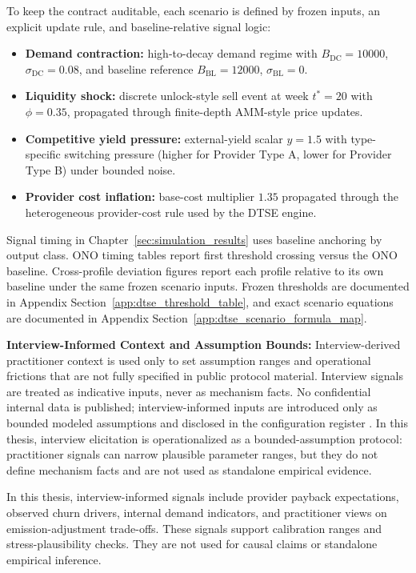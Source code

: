 To keep the contract auditable, each scenario is defined by frozen inputs, an explicit update rule, and baseline-relative signal logic:
\begin{itemize}
    \item \textbf{Demand contraction:} high-to-decay demand regime with \(B_{\mathrm{DC}}=10000\), \(\sigma_{\mathrm{DC}}=0.08\), and baseline reference \(B_{\mathrm{BL}}=12000\), \(\sigma_{\mathrm{BL}}=0\).
    \item \textbf{Liquidity shock:} discrete unlock-style sell event at week \(t^*=20\) with \(\phi=0.35\), propagated through finite-depth AMM-style price updates.
    \item \textbf{Competitive yield pressure:} external-yield scalar \(y=1.5\) with type-specific switching pressure (higher for Provider Type A, lower for Provider Type B) under bounded noise.
    \item \textbf{Provider cost inflation:} base-cost multiplier \(1.35\) propagated through the heterogeneous provider-cost rule used by the DTSE engine.
\end{itemize}

Signal timing in Chapter~\ref{sec:simulation_results} uses baseline anchoring by output class. ONO timing tables report first threshold crossing versus the ONO baseline. Cross-profile deviation figures report each profile relative to its own baseline under the same frozen scenario inputs. Frozen thresholds are documented in Appendix Section~\ref{app:dtse_threshold_table}, and exact scenario equations are documented in Appendix Section~\ref{app:dtse_scenario_formula_map}.

\noindent\textbf{Interview-Informed Context and Assumption Bounds:}
Interview-derived practitioner context is used only to set assumption ranges and operational frictions that are not fully specified in public protocol material. Interview signals are treated as indicative inputs, never as mechanism facts. No confidential internal data is published; interview-informed inputs are introduced only as bounded modeled assumptions and disclosed in the configuration register \cite{Morris2019, Braakman2022}.
In this thesis, interview elicitation is operationalized as a bounded-assumption protocol: practitioner signals can narrow plausible parameter ranges, but they do not define mechanism facts and are not used as standalone empirical evidence.

In this thesis, interview-informed signals include provider payback expectations, observed churn drivers, internal demand indicators, and practitioner views on emission-adjustment trade-offs. These signals support calibration ranges and stress-plausibility checks. They are not used for causal claims or standalone empirical inference.

